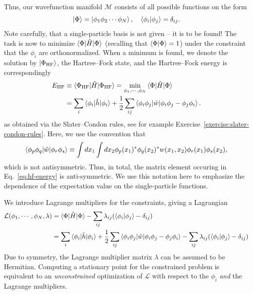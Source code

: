 \documentclass{report}
\theoremstyle{plain}
\theoremstyle{definition}
\begin{document}
Thus, our wavefunction manifold $\mathcal{M}$ consists of all possible
functions on the form
\begin{equation}
  \ket{\Phi} = \ket{\phi_1 \phi_2 \cdots \phi_N}, \quad
  \braket{\phi_i|\phi_j}= \delta_{ij}.
\end{equation}
Note carefully, that a single-particle basis is not given -- it is to
be found!
%
The task is now to minimize $\braket{\Phi|\hat{H}|\Phi}$ (recalling
that $\braket{\Phi|\Phi}=1$) under the constraint that the $\phi_i$
are orthonormalized. When a minimum is found, we denote the solution by
$\ket{\Phi_\text{HF}}$, the Hartree--Fock state, and the Hartree--Fock
energy is correspondingly
\begin{equation}
  \label{eq:hf-energy}
  \begin{split}
    E_\text{HF} &\equiv \braket{\Phi_\text{HF}|\hat{H}|\Phi_\text{HF}}
    = \min_{\phi_1,\cdots,\phi_N}
    \braket{\Phi|\hat{H}|\Phi}   \\
 & =  \sum_i 
  \braket{\phi_i|\hat{h}|\phi_i} + \frac{1}{2}\sum_{ij} \braket{\phi_i
    \phi_j | \hat{w} |\phi_i\phi_j - \phi_j\phi_i}.
  \end{split}
\end{equation}
as obtained via the Slater--Condon rules, see for example
Exercise~\ref{exercise:slater-condon-rules}. Here, we use the
convention that
\begin{equation}
  \braket{\phi_p\phi_q|\hat{w}|\phi_r\phi_s} \equiv \int
  dx_1\int dx_2 \phi_p(x_1)^*\phi_q(x_2)^* w(x_1,x_2)
  \phi_r(x_1)\phi_s(x_2),
\end{equation}
which is not antisymmetric. Thus, in total, the matrix element
occuring in Eq.~\eqref{eq:hf-energy} is anti-symmetric.
We use this notation here to emphasize the dependence of the expectation value on the
single-particle functions.


We introduce Lagrange multipliers for the constraints, giving
a Lagrangian
\begin{equation}
  \begin{split}
  \mathcal{L}(\phi_1,\cdots,\phi_N, \lambda) &=
  \braket{\Phi|\hat{H}|\Phi} -
  \sum_{ij}\lambda_{ij}(\braket{\phi_i|\phi_j} - \delta_{ij}) \\
  &=\sum_i 
  \braket{\phi_i|\hat{h}|\phi_i} + \frac{1}{2}\sum_{ij} \braket{\phi_i
    \phi_j | \hat{w} |\phi_i\phi_j - \phi_j\phi_i} -
  \sum_{ij}\lambda_{ij}(\braket{\phi_i|\phi_j}-\delta_{ij}) \label{eq:hf-lagrangian}
\end{split}
\end{equation}
Due to symmetry, the Lagrange multiplier matrix $\lambda$ can be
assumed to be Hermitian. Computing a stationary point for the
constrained problem is equivalent to an \emph{unconstrained}
optimization of $\mathcal{L}$ with respect to the $\phi_i$ \emph{and}
the Lagrange multipliers.
\end{document}
